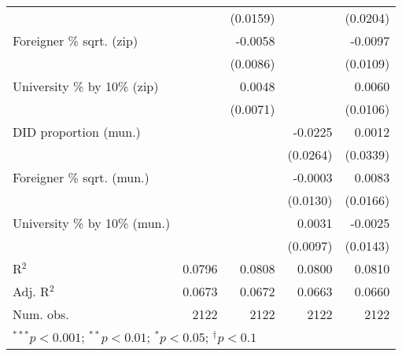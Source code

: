 \begin{tabular}{l D{.}{.}{4.7} D{.}{.}{4.7} D{.}{.}{4.7} D{.}{.}{4.7}}
                                  &               & (0.0159)      &               & (0.0204)      \\
Foreigner \% sqrt. (zip)          &               & -0.0058       &               & -0.0097       \\
                                  &               & (0.0086)      &               & (0.0109)      \\
University \% by 10\% (zip)       &               & 0.0048        &               & 0.0060        \\
                                  &               & (0.0071)      &               & (0.0106)      \\
DID proportion (mun.)             &               &               & -0.0225       & 0.0012        \\
                                  &               &               & (0.0264)      & (0.0339)      \\
Foreigner \% sqrt. (mun.)         &               &               & -0.0003       & 0.0083        \\
                                  &               &               & (0.0130)      & (0.0166)      \\
University \% by 10\% (mun.)      &               &               & 0.0031        & -0.0025       \\
                                  &               &               & (0.0097)      & (0.0143)      \\
\midrule
R$^2$                             & 0.0796        & 0.0808        & 0.0800        & 0.0810        \\
Adj. R$^2$                        & 0.0673        & 0.0672        & 0.0663        & 0.0660        \\
Num. obs.                         & 2122          & 2122          & 2122          & 2122          \\
\bottomrule
{}
\end{tabular}
